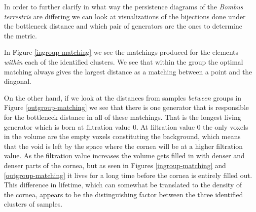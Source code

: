 In order to further clarify in what way the persistence diagrams of the \textit{Bombus terrestris} are differing we can look at visualizations of the bijections done under the bottleneck distance and which pair of generators are the ones to determine the metric.

In Figure \ref{ingroup-matching} we see the matchings produced for the elements \textit{within} each of the identified clusters. We see that within the group the optimal matching always gives the largest distance as a matching between a point and the diagonal.

On the other hand, if we look at the distances from samples \textit{between} groups in Figure \ref{outgroup-matching} we see that there is one generator that is responsible for the bottleneck distance in all of these matchings. That is the longest living generator which is born at filtration value $0$. At filtration value $0$ the only voxels in the volume are the empty voxels constituting the background, which means that the void is left by the space where the cornea will be at a higher filtration value. As the filtration value increases the volume gets filled in with denser and denser parts of the cornea, but as seen in Figures \ref{ingroup-matching} and \ref{outgroup-matching} it lives for a long time before the cornea is entirely filled out. This difference in lifetime, which can somewhat be translated to the density of the cornea, appears to be the distinguishing factor between the three identified clusters of samples.

